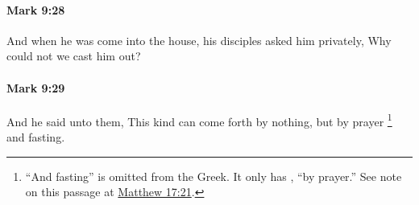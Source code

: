 		\paragraph{Mark 9:28} %
			\label{MARK-9-28}

			And when he was come into the house, his disciples asked him privately, Why could not we cast him out?

			\begin{framed}
			\scriptsize
				\begin{compactdesc}
					\item[SBLG] 
				\end{compactdesc}
			\end{framed}

		\paragraph{Mark 9:29} %
			\label{MARK-9-29}

			And he said unto them, This kind can come forth by nothing, but by prayer
				\footnote{%
					``And fasting'' is omitted from the Greek. It only has , ``by prayer.'' See note on this passage at \hyperref[MATTHEW-17-21]{Matthew 17:21}.
					}%
			and fasting.

